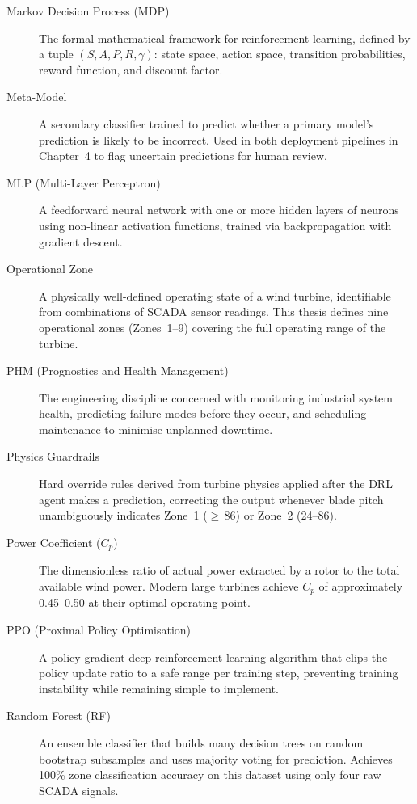 \begin{description}
  \item[Markov Decision Process (MDP)] The formal mathematical framework for
    reinforcement learning, defined by a tuple $(S, A, P, R, \gamma)$: state space,
    action space, transition probabilities, reward function, and discount factor.

  \item[Meta-Model] A secondary classifier trained to predict whether a primary model's
    prediction is likely to be incorrect. Used in both deployment pipelines in Chapter~4
    to flag uncertain predictions for human review.

  \item[MLP (Multi-Layer Perceptron)] A feedforward neural network with one or more
    hidden layers of neurons using non-linear activation functions, trained via
    backpropagation with gradient descent.

  \item[Operational Zone] A physically well-defined operating state of a wind turbine,
    identifiable from combinations of SCADA sensor readings. This thesis defines nine
    operational zones (Zones~1--9) covering the full operating range of the turbine.

  \item[PHM (Prognostics and Health Management)] The engineering discipline concerned
    with monitoring industrial system health, predicting failure modes before they occur,
    and scheduling maintenance to minimise unplanned downtime.

  \item[Physics Guardrails] Hard override rules derived from turbine physics applied
    after the DRL agent makes a prediction, correcting the output whenever blade pitch
    unambiguously indicates Zone~1 ($\geq$\,86\textdegree) or Zone~2
    (24\textdegree--86\textdegree).

  \item[Power Coefficient ($C_p$)] The dimensionless ratio of actual power extracted by
    a rotor to the total available wind power. Modern large turbines achieve $C_p$ of
    approximately 0.45--0.50 at their optimal operating point.

  \item[PPO (Proximal Policy Optimisation)] A policy gradient deep reinforcement learning
    algorithm that clips the policy update ratio to a safe range per training step,
    preventing training instability while remaining simple to implement.

  \item[Random Forest (RF)] An ensemble classifier that builds many decision trees on
    random bootstrap subsamples and uses majority voting for prediction. Achieves 100\%
    zone classification accuracy on this dataset using only four raw SCADA signals.


\end{description}
